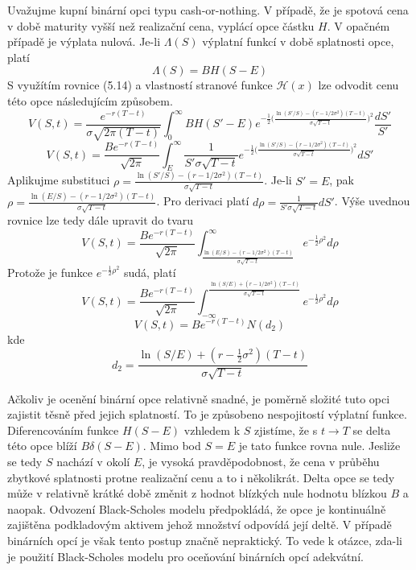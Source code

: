 \documentclass[a4paper]{book}
\begin{document}
Uvažujme kupní binární opci typu cash-or-nothing. V případě, že je spotová cena v době maturity vyšší než realizační cena, vyplácí opce částku $H$. V opačném případě je výplata nulová. Je-li $\Lambda(S)$ výplatní funkcí v době splatnosti opce, platí
\begin{equation*}
\Lambda(S) = B H(S - E)
\end{equation*}
S využítím rovnice (5.14) a vlastností stranové funkce $\mathcal{H}(x)$ lze odvodit cenu této opce následujícím způsobem.
\begin{equation*}
V(S,t) = \frac{e^{-r(T-t)}}{\sigma \sqrt{2 \pi (T - t)}} \int^{\infty}_{0} B H(S' - E)e^{-\frac{1}{2}\big( \frac{\ln(S'/S)-(r - 1/2 \sigma^2)(T-t)}{\sigma \sqrt{T-t}} \big)^2}\frac{dS'}{S'}
\end{equation*}
\begin{equation*}
V(S,t) = \frac{B e^{-r(T-t)}}{\sqrt{2 \pi}} \int^{\infty}_{E} \frac{1}{S' \sigma \sqrt{T - t}}e^{-\frac{1}{2}\big( \frac{\ln(S'/S)-(r - 1/2 \sigma^2)(T-t)}{\sigma \sqrt{T-t}} \big)^2} dS'
\end{equation*}
Aplikujme substituci $\rho = \frac{\ln(S'/S)-(r - 1/2 \sigma^2)(T-t)}{\sigma \sqrt{T-t}}$. Je-li $S' = E$, pak $\rho = \frac{\ln(E/S)-(r - 1/2 \sigma^2)(T-t)}{\sigma \sqrt{T-t}}$. Pro derivaci platí $d \rho = \frac{1}{S' \sigma \sqrt{T - t}} d S'$. Výše uvednou rovnice lze tedy dále upravit do tvaru
\begin{equation*}
V(S,t) = \frac{B e^{-r(T-t)}}{\sqrt{2 \pi}} \int^{\infty}_{\frac{\ln(E/S)-(r - 1/2 \sigma^2)(T-t)}{\sigma \sqrt{T-t}}}e^{-\frac{1}{2}\rho^2} d\rho
\end{equation*}
Protože je funkce $e^{-\frac{1}{2}\rho^2}$ sudá, platí
\begin{equation*}
V(S,t) = \frac{B e^{-r(T-t)}}{\sqrt{2 \pi}} \int^{\frac{\ln(S/E)+(r - 1/2 \sigma^2)(T-t)}{\sigma \sqrt{T-t}}}_{-\infty} e^{-\frac{1}{2}\rho^2} d\rho
\end{equation*}
\begin{equation*}
V(S,t) = B e^{-r(T-t)}N(d_2)
\end{equation*}
kde
\begin{equation*}
d_2 = \frac{\ln(S/E)+(r - \frac{1}{2} \sigma^2)(T-t)}{\sigma \sqrt{T-t}}
\end{equation*}

Ačkoliv je ocenění binární opce relativně snadné, je poměrně složité tuto opci zajistit těsně před jejich splatností. To je způsobeno nespojitostí výplatní funkce. Diferencováním funkce $H(S-E)$ vzhledem k $S$ zjistíme, že s $t \rightarrow T$ se delta této opce blíží $B \delta(S -E)$. Mimo bod $S = E$ je tato funkce rovna nule. Jesliže se tedy $S$ nachází v okolí $E$, je vysoká pravděpodobnost, že cena v průběhu zbytkové splatnosti protne realizační cenu a to i několikrát. Delta opce se tedy může v relativně krátké době změnit z hodnot blízkých nule hodnotu blízkou $B$ a naopak. Odvození Black-Scholes modelu předpokládá, že opce je kontinuálně zajištěna podkladovým aktivem jehož množství odpovídá její deltě. V případě binárních opcí je však tento postup značně nepraktický. To vede k otázce, zda-li je použití Black-Scholes modelu pro oceňování binárních opcí adekvátní.
\end{document}

